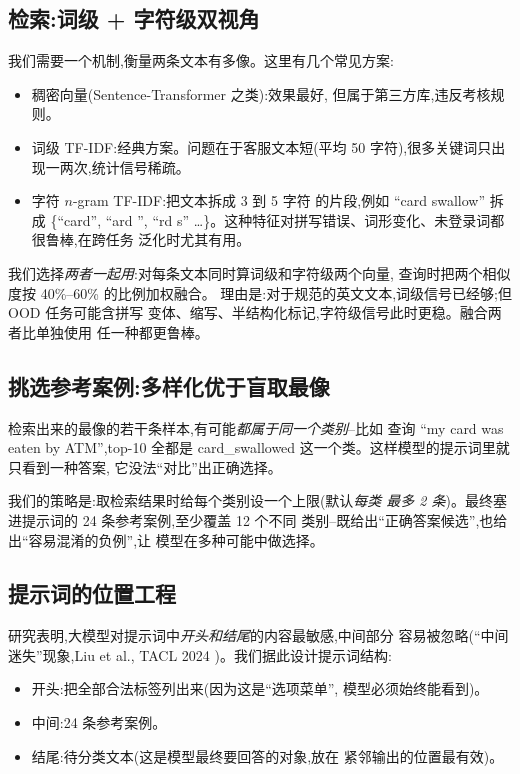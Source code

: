 \documentclass[10pt,twocolumn,letterpaper]{article}
\begin{document}
\subsection{检索:词级 + 字符级双视角}
我们需要一个机制,衡量两条文本有多像。这里有几个常见方案:
\begin{itemize}[leftmargin=*,itemsep=1pt,topsep=2pt]
\item 稠密向量(Sentence-Transformer 之类):效果最好,
  但属于第三方库,违反考核规则。
\item 词级 TF-IDF:经典方案。问题在于客服文本短(平均 50
  字符),很多关键词只出现一两次,统计信号稀疏。
\item 字符 $n$-gram TF-IDF:把文本拆成 3 到 5 字符
  的片段,例如 ``card swallow'' 拆成 \{``card'', ``ard '', ``rd s''
  \dots\}。这种特征对拼写错误、词形变化、未登录词都很鲁棒,在跨任务
  泛化时尤其有用。
\end{itemize}

我们选择\emph{两者一起用}:对每条文本同时算词级和字符级两个向量,
查询时把两个相似度按 40\%--60\% 的比例加权融合。
理由是:对于规范的英文文本,词级信号已经够;但 OOD 任务可能含拼写
变体、缩写、半结构化标记,字符级信号此时更稳。融合两者比单独使用
任一种都更鲁棒。

\subsection{挑选参考案例:多样化优于盲取最像}
检索出来的最像的若干条样本,有可能\emph{都属于同一个类别}--比如
查询 ``my card was eaten by ATM'',top-10 全都是
card\_swallowed 这一个类。这样模型的提示词里就只看到一种答案,
它没法``对比''出正确选择。

我们的策略是:取检索结果时给每个类别设一个上限(默认\emph{每类
最多 2 条})。最终塞进提示词的 24 条参考案例,至少覆盖 12 个不同
类别--既给出``正确答案候选'',也给出``容易混淆的负例'',让
模型在多种可能中做选择。

\subsection{提示词的位置工程}
研究表明,大模型对提示词中\emph{开头和结尾}的内容最敏感,中间部分
容易被忽略(``中间迷失''现象,Liu et al., TACL 2024
\cite{lostinthemiddle})。我们据此设计提示词结构:
\begin{itemize}[leftmargin=*,itemsep=1pt,topsep=2pt]
\item 开头:把全部合法标签列出来(因为这是``选项菜单'',
  模型必须始终能看到)。
\item 中间:24 条参考案例。
\item 结尾:待分类文本(这是模型最终要回答的对象,放在
  紧邻输出的位置最有效)。
\end{itemize}
\end{document}
